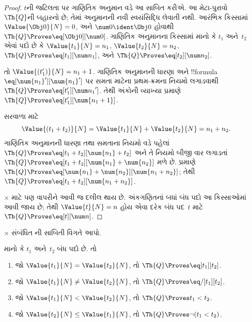 \documentclass[../../../include/open-logic-section]{subfiles}
\begin{document}
\begin{proof}
$t$ની જટિલતા પર ગાણિતિક અનુમાન
વડે આ સાબિત કરીએ. આ મેટા-પુરાવો $\Th{Q}$ની બહારનો છે;
તેમાં અનુમાનની નવી સ્વયંસિદ્ધિ લેવાતી નથી.
આરંભિક કિસ્સામાં
$\Value{\Obj 0}{N} = 0$,
અને $\num 0 \ident \Obj 0$
હોવાથી
$\Th{Q} \Proves \eq[\Obj 0][\num 0]$.
%
ગાણિતિક અનુમાનના કિસ્સામાં માનો કે
$t_1$ અને~$t_2$ એવાં પદો છે કે
$\Value{t_1}{N} = n_1$,
$\Value{t_2}{N} = n_2$,
$\Th{Q} \Proves \eq[t_1][\num n_1]$,
અને $\Th{Q} \Proves
\eq[t_2][\num n_2]$.

તો $\Value{(t_1')}{N} = n_1 + 1$.
ગાણિતિક અનુમાનની ધારણા અને
!!{formula}~$\eq[\num{n_1}'][\num{n_1}']$
પર સમતા માટેના પ્રથમ-ક્રમના
નિયમો લગાડવાથી
$\Th{Q} \Proves
\eq[t_1'][{\num n_1}']$.
તેથી અંકોની વ્યાખ્યા પ્રમાણે
$\Th{Q} \Proves
\eq[t_1'][\num{n_1 + 1}]$.

સરવાળા માટે
\[
      \Value{(t_1 + t_2)}{N}
    = \Value{t_1}{N} + \Value{t_2}{N}
    = n_1 + n_2.
\]
ગાણિતિક અનુમાનની ધારણા તથા
સમતાના નિયમો વડે પહેલાં
$\Th{Q} \Proves
\eq[t_1 + t_2][\num{n_1} + t_2]$
અને તે નિયમો બીજી વાર
લગાડતાં
$\Th{Q} \Proves
\eq[t_1 + t_2][\num{n_1} + \num{n_2}]$
મળે છે.
પ્રમાણે
$\Th{Q} \Proves
\eq[\num{n_1} + \num{n_2}][\num{n_1 + n_2}]$;
તેથી $\Th{Q} \Proves
\eq[t_1 + t_2][\num{n_1 + n_2}]$.

$\times$ માટે પણ
વાપરીને આવી જ દલીલ થાય છે.
%
અંકગણિતનાં બધાં બંધ પદો
આ કિસ્સાઓમાં આવી જાય છે;
તેથી $\Value{t}{N} = n$
હોય એવા દરેક બંધ પદ~$t$
માટે $\Th{Q} \Proves
\eq[t][\num n]$.
\end{proof}
 
\begin{prob}
$\times$ સંબંધિત
ની
સાબિતી વિગતે આપો.
\end{prob}

\begin{lem}
માનો કે $t_1$ અને~$t_2$
બંધ પદો છે. તો
\begin{enumerate}
\item જો $\Value{t_1}{N} = \Value{t_2}{N}$,
    તો $\Th{Q} \Proves \eq[t_1][t_2]$.
\item જો $\Value{t_1}{N} \neq \Value{t_2}{N}$,
    તો $\Th{Q} \Proves \eq/[t_1][t_2]$.
\item જો $\Value{t_1}{N} < \Value{t_2}{N}$,
    તો $\Th{Q} \Proves t_1 < t_2$.
\item જો $\Value{t_2}{N} \leq \Value{t_1}{N}$,
    તો $\Th{Q} \Proves \lnot(t_1 < t_2)$.
\end{enumerate}
\end{lem}
\end{document}
